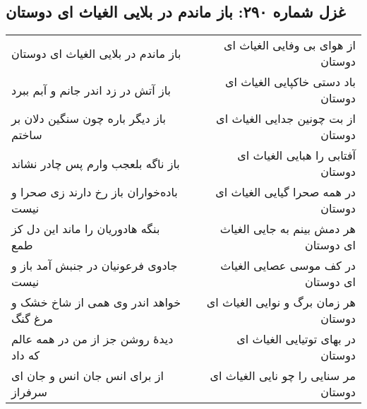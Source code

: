 \begin{center}
\section*{غزل شماره ۲۹۰: باز ماندم در بلایی الغیاث ای دوستان}
\label{sec:290}
\begin{longtable}{l p{0.5cm} r}
باز ماندم در بلایی الغیاث ای دوستان
&&
از هوای بی وفایی الغیاث ای دوستان
\\
باز آتش در زد اندر جانم و آبم ببرد
&&
باد دستی خاکپایی الغیاث ای دوستان
\\
باز دیگر باره چون سنگین دلان بر ساختم
&&
از بت چونین جدایی الغیاث ای دوستان
\\
باز ناگه بلعجب وارم پس چادر نشاند
&&
آفتابی را هبایی الغیاث ای دوستان
\\
باده‌خواران باز رخ دارند زی صحرا و نیست
&&
در همه صحرا گیایی الغیاث ای دوستان
\\
بنگه هادوریان را ماند این دل کز طمع
&&
هر دمش بینم به جایی الغیاث ای دوستان
\\
جادوی فرعونیان در جنبش آمد باز و نیست
&&
در کف موسی عصایی الغیاث ای دوستان
\\
خواهد اندر وی همی از شاخ خشک و مرغ گنگ
&&
هر زمان برگ و نوایی الغیاث ای دوستان
\\
دیدهٔ روشن جز از من در همه عالم که داد
&&
در بهای توتیایی الغیاث ای دوستان
\\
از برای انس جان انس و جان ای سرفراز
&&
مر سنایی را چو نایی الغیاث ای دوستان
\\
\end{longtable}
\end{center}
